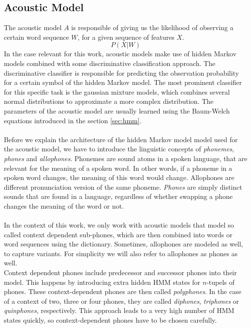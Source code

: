 
\subsection{Acoustic Model}
\label{sec:acoustic_model}
The acoustic model $A$ is responsible of giving us the likelihood of observing a certain word sequence $W$, for a given sequence of features $X$. 
\[
	P(X|W)
\]
In the case relevant for this work, acoustic models make use of hidden Markov models combined with some discriminative classification approach. The discriminative classifier is responsible for predicting the observation probability for a certain symbol of the hidden Markov model. The most prominent classifier for this specific task is the gaussian mixture models, which combines several normal distributions to approximate a more complex distribution. The parameters of the acoustic model are usually learned using the Baum-Welch equations introduced in the section \ref{sec:hmm}. \\ \\
Before we explain the architecture of the hidden Markov model model used for the acoustic model, we have to introduce the linguistic concepts of \textit{phonemes}, \textit{phones} and \textit{allophones}. Phonemes are sound atoms in a spoken language, that are relevant for the meaning of a spoken word. In other words, if a phoneme in a spoken word changes, the meaning of this word would change. Allophones are different pronunciation version of the same phoneme. \textit{Phones} are simply distinct sounds that are found in a language, regardless of whether swapping a phone changes the meaning of the word or not. \\ \\
In the context of this work, we only work with acoustic models that model so called context dependent sub-phones, which are then combined into words or word sequences using the dictionary. Sometimes, allophones are modeled as well, to capture variants. For simplicity we will also refer to allophones as phones as well. \\
Context dependent phones include predecessor and successor phones into their model. This happens by introducing extra hidden HMM states for $n$-tupels of phones. These context-dependent phones are then called \textit{polyphones}. In the case of a context of two, three or four phones, they are called \textit{diphones}, \textit{triphones} or \textit{quinphones}, respectively. This approach leads to a very high number of HMM states quickly, so context-dependent phones have to be chosen carefully. \\
